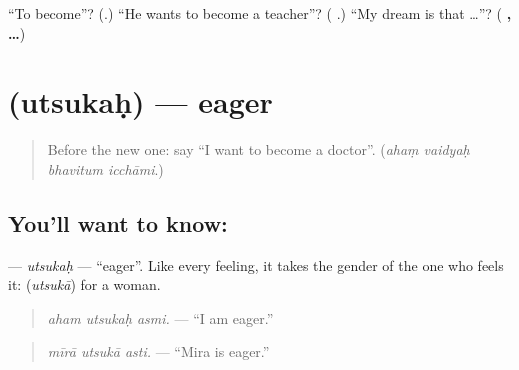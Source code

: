 \begin{tcolorbox}[breakable,colback=teal!4,colframe=teal!35!black,title={Before you move on}]
\textquotedblleft{}To become\textquotedblright{}? (\textbf{}.) \textquotedblleft{}He wants to become a teacher\textquotedblright{}? (\textbf{   }.) \textquotedblleft{}My dream is that …\textquotedblright{}? (\textbf{  ,  …})
\end{tcolorbox}
\section[\texorpdfstring{\sk{उत्सुकः} (utsukaḥ)}{उत्सुकः (utsukaḥ)}]{ (utsukaḥ) — eager}

\label{lesson:SA-C282-utsukah}



\begin{quote}
Before the new one: say \textquotedblleft{}I want to become a doctor\textquotedblright{}. (\emph{ahaṃ vaidyaḥ bhavitum icchāmi}.)
\end{quote}

\subsection*{You'll want to know: }
\textbf{} — \emph{utsukaḥ} — \textquotedblleft{}eager\textquotedblright{}. Like every feeling, it takes the gender of the one who feels it: \textbf{} (\emph{utsukā}) for a woman.

\begin{quote}
\textbf{  }
\end{quote}

\begin{quote}
\emph{aham utsukaḥ asmi.} — \textquotedblleft{}I am eager.\textquotedblright{}
\end{quote}

\begin{quote}
\textbf{  }
\end{quote}

\begin{quote}
\emph{mīrā utsukā asti.} — \textquotedblleft{}Mira is eager.\textquotedblright{}
\end{quote}

\begin{quote}
\textbf{    }
\end{quote}

